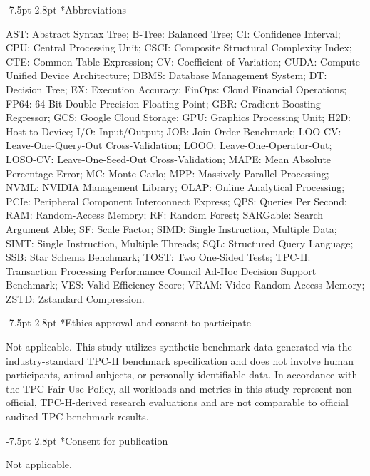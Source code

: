 \documentclass[10pt,a4paper]{article}
\makeatletter
\renewcommand\subsection{\@startsection{subsection}{2}{\z@}%
  {-7.5pt \@plus -2pt \@minus -1pt}%
  {2.8pt \@plus 1pt}%
  {\normalfont\normalsize\bfseries}}
\makeatother
\begin{document}
\subsection*{Abbreviations}
{\scriptsize AST: Abstract Syntax Tree; B-Tree: Balanced Tree; CI: Confidence Interval; CPU: Central Processing Unit; CSCI: Composite Structural Complexity Index; CTE: Common Table Expression; CV: Coefficient of Variation; CUDA: Compute Unified Device Architecture; DBMS: Database Management System; DT: Decision Tree; EX: Execution Accuracy; FinOps: Cloud Financial Operations; FP64: 64-Bit Double-Precision Floating-Point; GBR: Gradient Boosting Regressor; GCS: Google Cloud Storage; GPU: Graphics Processing Unit; H2D: Host-to-Device; I/O: Input/Output; JOB: Join Order Benchmark; LOO-CV: Leave-One-Query-Out Cross-Validation; LOOO: Leave-One-Operator-Out; LOSO-CV: Leave-One-Seed-Out Cross-Validation; MAPE: Mean Absolute Percentage Error; MC: Monte Carlo; MPP: Massively Parallel Processing; NVML: NVIDIA Management Library; OLAP: Online Analytical Processing; PCIe: Peripheral Component Interconnect Express; QPS: Queries Per Second; RAM: Random-Access Memory; RF: Random Forest; SARGable: Search Argument Able; SF: Scale Factor; SIMD: Single Instruction, Multiple Data; SIMT: Single Instruction, Multiple Threads; SQL: Structured Query Language; SSB: Star Schema Benchmark; TOST: Two One-Sided Tests; TPC-H: Transaction Processing Performance Council Ad-Hoc Decision Support Benchmark; VES: Valid Efficiency Score; VRAM: Video Random-Access Memory; ZSTD: Zstandard Compression.\par}
\vspace{-5pt}
\subsection*{Ethics approval and consent to participate}
{\scriptsize Not applicable. This study utilizes synthetic benchmark data generated via the industry-standard TPC-H benchmark specification \cite{tpc2022tpch} and does not involve human participants, animal subjects, or personally identifiable data. In accordance with the TPC Fair-Use Policy, all workloads and metrics in this study represent non-official, TPC-H-derived research evaluations and are not comparable to official audited TPC benchmark results.\par}
\vspace{-5pt}
\subsection*{Consent for publication}
{\scriptsize Not applicable.\par}
\vspace{-5pt}
\end{document}

